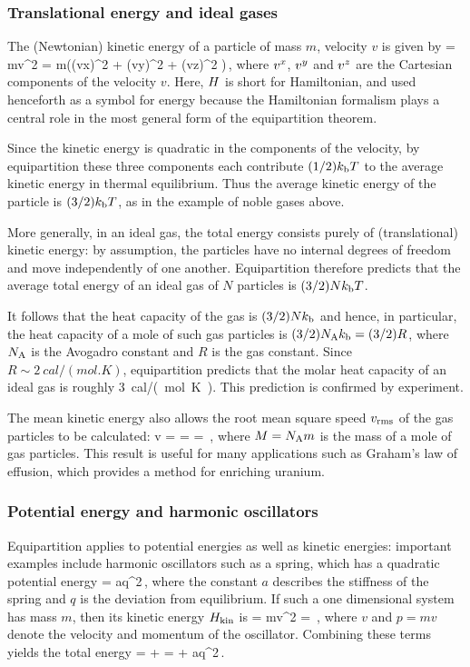 \subsubsection{Translational energy and ideal gases}
The (Newtonian) kinetic energy of a particle of mass $m$, velocity $v$ is given by
\beq
\hken = mv^2 
      = m\left((\ivec vx)^2 + (\ivec vy)^2 + (\ivec vz)^2 \right)\,,
\eeq
where ${v}^{x}$, ${v}^{y}$ and ${v}^{z}$ are the Cartesian components of the velocity $v$. Here, $H$ is short for Hamiltonian, and used henceforth as a symbol for energy because the Hamiltonian formalism plays a central role in the most general form of the equipartition theorem.

Since the kinetic energy is quadratic in the components of the velocity, by equipartition these three components each contribute $(1/2)k_\text{b} T$ to the average kinetic energy in thermal equilibrium. Thus the average kinetic energy of the particle is $(3/2)k_\text{b} T$, as in the example of noble gases above.

More generally, in an ideal gas, the total energy consists purely of (translational) kinetic energy: by assumption, the particles have no internal degrees of freedom and move independently of one another. Equipartition therefore predicts that the average total energy of an ideal gas of $N$ particles is $(3/2)Nk_\text{b} T$.

It follows that the heat capacity of the gas is $(3/2)Nk_\text{b}$ and hence, in particular, the heat capacity of a mole of such gas particles is $(3/2)N_\text{A}k_\text{b} = (3/2)R$, where $N_\text{A}$ is the Avogadro constant and $R$ is the gas constant. Since $R\sim \SI{2}{cal/(mol.K)}$, equipartition predicts that the molar heat capacity of an ideal gas is roughly \SI{3}{cal/(mol.K)}. This prediction is confirmed by experiment.

The mean kinetic energy also allows the root mean square speed $v_\text{rms}$ of the gas particles to be calculated:
\beq
v =  =  = \,,
\eeq
where $M = N_\text{A}m$ is the mass of a mole of gas particles. This result is useful for many applications such as Graham's law of effusion, which provides a method for enriching uranium.


\subsubsection{Potential energy and harmonic oscillators}
Equipartition applies to potential energies as well as kinetic energies: important examples include harmonic oscillators such as a spring, which has a quadratic potential energy
\beq
\hpen = aq^2\,,
\eeq
where the constant $a$ describes the stiffness of the spring and $q$ is the deviation from equilibrium. If such a one dimensional system has mass $m$, then its kinetic energy $H_\text{kin}$ is
\beq
\hken = mv^2 = \,,
\eeq
where $v$ and $p = mv$ denote the velocity and momentum of the oscillator. Combining these terms yields the total energy
\beq
\ham = \hken + \hpen =  + aq^2\,.
\eeq

